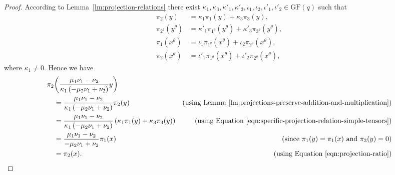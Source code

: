\documentclass[ALCO, Unicode]{cedram}
\newcommand{\GF}{\mathrm{GF}}
\begin{document}
\begin{proof}
According to Lemma~\ref{lm:projection-relations} there exist $\kappa_1, \kappa_3, \kappa'_1, \kappa'_3, \iota_1, \iota_2, \iota'_1, \iota'_2 \in \GF{\left(q \right)}$ such that
\begin{align}
    \pi_2{\left(y \right)} &= \kappa_1 \pi_1{\left(y \right)} + \kappa_3 \pi_3{\left(y \right)}, \label{eqn:specific-projection-relation-simple-tensors} \\
    \pi_{2^\theta}{\left(y^\theta \right)} &= \kappa'_1 \pi_{1^\theta}{\left(y^\theta \right)} + \kappa'_3 \pi_{3^\theta}{\left(y^\theta \right)}, \label{eqn:specific-projection-relation-image-simple-tensors} \\
    \pi_1{\left(x^\theta \right)} &= \iota_1 \pi_{1^\theta}{\left(x^\theta \right)} + \iota_2 \pi_{2^\theta}{\left(x^\theta \right)}, \label{eqn:pi-1-of-image} \\
    \pi_2{\left(x^\theta \right)} &= \iota'_1 \pi_{1^\theta}{\left(x^\theta \right)} + \iota'_2 \pi_{2^\theta}{\left(x^\theta \right)}, \label{eqn:pi-2-of-image}
\end{align}
where $\kappa_1 \neq 0$. Hence we have
\begin{align*}
    \pi_2&{\left(\frac{\mu_1 \nu_1 - \nu_2}{\kappa_1 \left(-\mu_2 \nu_1 + \nu_2 \right)} y \right)}  \\
    &= \frac{\mu_1 \nu_1 - \nu_2}{\kappa_1 \left(-\mu_2 \nu_1 + \nu_2 \right)} \pi_2{\left(y \right)} &\text{(using Lemma~\ref{lm:projections-preserve-addition-and-multiplication})} \\
    &= \frac{\mu_1 \nu_1 - \nu_2}{\kappa_1 \left(-\mu_2 \nu_1 + \nu_2 \right)} \left(\kappa_1 \pi_1{\left(y \right)} + \kappa_3 \pi_3{\left(y \right)} \right) &\text{(using Equation \eqref{eqn:specific-projection-relation-simple-tensors})} \\
    &= \frac{\mu_1 \nu_1 - \nu_2}{-\mu_2 \nu_1 + \nu_2} \pi_1 {\left(x \right)} &\text{(since $\pi_1{\left(y \right)} = \pi_1{\left(x \right)}$ and $\pi_3{\left(y \right)} = 0$)} \\
    &= \pi_2{\left(x \right)}. &\text{(using Equation \eqref{eqn:projection-ratio})}
\end{align*}


\end{proof}
\end{document}
